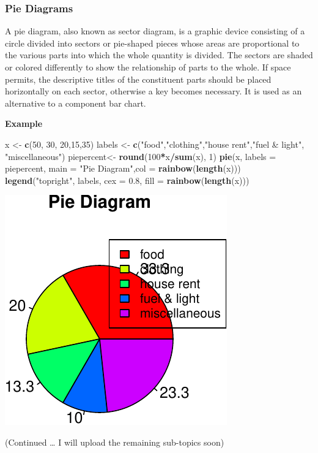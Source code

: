 \documentclass[]{article}
\newenvironment{Shaded}{\begin{snugshade}}{\end{snugshade}}
\newcommand{\DataTypeTok}[1]{\textcolor[rgb]{0.13,0.29,0.53}{#1}}
\newcommand{\DecValTok}[1]{\textcolor[rgb]{0.00,0.00,0.81}{#1}}
\newcommand{\FloatTok}[1]{\textcolor[rgb]{0.00,0.00,0.81}{#1}}
\newcommand{\KeywordTok}[1]{\textcolor[rgb]{0.13,0.29,0.53}{\textbf{#1}}}
\newcommand{\NormalTok}[1]{#1}
\newcommand{\OperatorTok}[1]{\textcolor[rgb]{0.81,0.36,0.00}{\textbf{#1}}}
\newcommand{\StringTok}[1]{\textcolor[rgb]{0.31,0.60,0.02}{#1}}
\begin{document}
\hypertarget{pie-diagrams}{%
\subsubsection{Pie Diagrams}\label{pie-diagrams}}

A pie diagram, also known as sector diagram, is a graphic device
consisting of a circle divided into sectors or pie-shaped pieces whose
areas are proportional to the various parts into which the whole
quantity is divided. The sectors are shaded or colored differently to
show the relationship of parts to the whole. If space permits, the
descriptive titles of the constituent parts should be placed
horizontally on each sector, otherwise a key becomes necessary. It is
used as an alternative to a component bar chart.

\textbf{Example}

\begin{Shaded}
\begin{Highlighting}[]
\NormalTok{x \textless{}{-}}\StringTok{  }\KeywordTok{c}\NormalTok{(}\DecValTok{50}\NormalTok{, }\DecValTok{30}\NormalTok{, }\DecValTok{20}\NormalTok{,}\DecValTok{15}\NormalTok{,}\DecValTok{35}\NormalTok{)}
\NormalTok{labels \textless{}{-}}\StringTok{  }\KeywordTok{c}\NormalTok{(}\StringTok{"food"}\NormalTok{,}\StringTok{"clothing"}\NormalTok{,}\StringTok{"house rent"}\NormalTok{,}\StringTok{"fuel \& light"}\NormalTok{, }\StringTok{"miscellaneous"}\NormalTok{)}
\NormalTok{piepercent\textless{}{-}}\StringTok{ }\KeywordTok{round}\NormalTok{(}\DecValTok{100}\OperatorTok{*}\NormalTok{x}\OperatorTok{/}\KeywordTok{sum}\NormalTok{(x), }\DecValTok{1}\NormalTok{)}
\KeywordTok{pie}\NormalTok{(x, }\DataTypeTok{labels =}\NormalTok{ piepercent, }\DataTypeTok{main =} \StringTok{"Pie Diagram"}\NormalTok{,}\DataTypeTok{col =} \KeywordTok{rainbow}\NormalTok{(}\KeywordTok{length}\NormalTok{(x)))}
\KeywordTok{legend}\NormalTok{(}\StringTok{"topright"}\NormalTok{, labels, }\DataTypeTok{cex =} \FloatTok{0.8}\NormalTok{, }\DataTypeTok{fill =} \KeywordTok{rainbow}\NormalTok{(}\KeywordTok{length}\NormalTok{(x)))}
\end{Highlighting}
\end{Shaded}

\includegraphics{chapt2_files/figure-latex/unnamed-chunk-4-1.pdf}

(Continued \ldots{} I will upload the remaining sub-topics soon)
\end{document}
